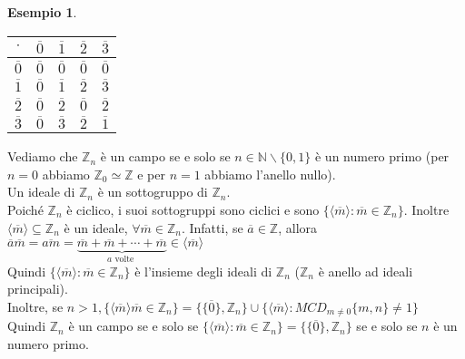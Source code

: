 \documentclass[a4paper,12pt]{article}
\theoremstyle{def}
\theoremstyle{prop}
\theoremstyle{esempio}
\newtheorem*{example}{Esempio}
\theoremstyle{dimostrazione}
\theoremstyle{teo}
\theoremstyle{osservazione}
\begin{document}
\begin{example}
\begin{itemize}
\begin{table}[htbp]
\begin{tabular}{ c | c | c | c | c}
                      \(\cdot\)        & \(\overline{0}\) & \(\overline{1}\) & \(\overline{2}\) & \(\overline{3}\) \\ \hline
                      \(\overline{0}\) & \(\overline{0}\) & \(\overline{0}\) & \(\overline{0}\) & \(\overline{0}\) \\ \hline
                      \(\overline{1}\) & \(\overline{0}\) & \(\overline{1}\) & \(\overline{2}\) & \(\overline{3}\) \\ \hline
                      \(\overline{2}\) & \(\overline{0}\) & \(\overline{2}\) & \(\overline{0}\) & \(\overline{2}\) \\ \hline
                      \(\overline{3}\) & \(\overline{0}\) & \(\overline{3}\) & \(\overline{2}\) & \(\overline{1}\) \\
                  \end{tabular}
              \end{table}
    \end{itemize}
\end{example}

Vediamo che \(\mathbb{Z}_n\) è un campo se e solo se \(n \in \mathbb{N} \backslash \{0,1\}\)
è un numero primo (per \(n =0 \) abbiamo \(\mathbb{Z}_0 \simeq \mathbb{Z} \) e per \(n = 1\) abbiamo l'anello nullo).\\
Un ideale di \(\mathbb{Z}_n \) è un sottogruppo di \(\mathbb{Z}_n\).\\
Poiché \(\mathbb{Z}_n\) è ciclico, i suoi sottogruppi sono ciclici e sono \(\{\langle \overline{m} \rangle :
\overline{m} \in \mathbb{Z}_n\}\). Inoltre \(\langle \overline{m} \rangle \subseteq \mathbb{Z}_n\) è un ideale,
\(\forall \overline{m} \in \mathbb{Z}_n\). Infatti, se \(\overline{a} \in \mathbb{Z} \), allora \(
\overline{a} \overline{m} = \overline{am} = \underbrace{\overline{m} + \overline{m} + \cdots + \overline{m}}_{a \text{ volte }}  \in
\langle \overline{m} \rangle\)\\
Quindi \(\{\langle \overline{m} \rangle : \overline{m} \in \mathbb{Z}_n\}\) è l'insieme
degli ideali di \(\mathbb{Z}_n\) (\(\mathbb{Z}_n\) è anello ad ideali principali).\\
Inoltre, se \(n > 1, \{\langle \overline{m} \rangle \overline{m} \in \mathbb{Z}_n\} =
\{\{\overline{0}\}, \mathbb{Z}_n\} \cup \{\langle \overline{m} \rangle : MCD_{m \neq 0} \{m,n\} \neq 1\}\)\\
Quindi \(\mathbb{Z}_n\) è un campo se e solo se \(\{\langle \overline{m} \rangle : \overline{m} \in \mathbb{Z}_n\} =
\{\{\overline{0}\}, \mathbb{Z}_n\}\) se e solo se \(n\) è un numero primo.
\end{document}
